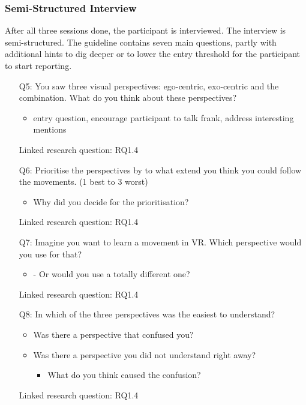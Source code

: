 \subsubsection{Semi-Structured Interview}
After all three sessions done, the participant is interviewed. The interview is semi-structured. The guideline contains seven main questions, partly with additional hints to dig deeper or to lower the entry threshold for the participant to start reporting.
\begin{itemize}
	\item[Q5:] You saw three visual perspectives: ego-centric, exo-centric and the combination. What do you think about these perspectives?
	\begin{itemize}
		\item entry question, encourage participant to talk frank, address interesting mentions
	\end{itemize}
	\item[] Linked research question: RQ1.4

	\item[Q6:] Prioritise the perspectives by to what extend you think you could follow the movements. (1 best to 3 worst) 	
	\begin{itemize}
		\item Why did you decide for the prioritisation?
	\end{itemize}
	\item[] Linked research question: RQ1.4

	\item[Q7:] Imagine you want to learn a movement in VR. Which perspective would you use for that?
	\begin{itemize}
		\item -	Or would you use a totally different one?
	\end{itemize}
	\item[] Linked research question: RQ1.4

	\item[Q8:] In which of the three perspectives was the easiest to understand? 
	\begin{itemize}
		\item Was there a perspective that confused you?
		\item Was there a perspective you did not understand right away?
		\begin{itemize}
			\item What do you think caused the confusion?
		\end{itemize}
	\end{itemize}
	\item[] Linked research question: RQ1.4


\end{itemize}
